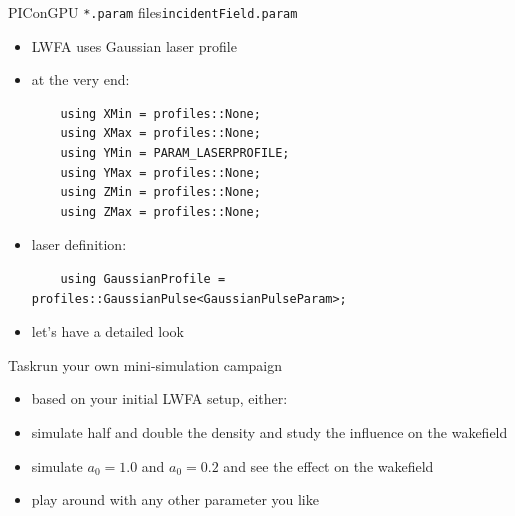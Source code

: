 \documentclass[
  aspectratio=169,
  10pt
]{beamer}
\begin{document}
\begin{frame}[t,fragile]{PIConGPU \texttt{*.param} files}{\texttt{incidentField.param}}

\begin{itemize}
    \item LWFA uses Gaussian laser profile
    \item at the very end:
\begin{verbatim}
    using XMin = profiles::None;
    using XMax = profiles::None;
    using YMin = PARAM_LASERPROFILE;
    using YMax = profiles::None;
    using ZMin = profiles::None;
    using ZMax = profiles::None;    
\end{verbatim}
    \item laser definition:
\begin{verbatim}
    using GaussianProfile = profiles::GaussianPulse<GaussianPulseParam>;
\end{verbatim}    
    \item let's have a detailed look
\end{itemize}

\end{frame}




\begin{frame}[t,fragile]{Task}{run your own mini-simulation campaign}

\begin{itemize}
    \item based on your initial LWFA setup, either:
    \item simulate half and double the density and study the influence on the wakefield
    \item simulate $a_0=1.0$ and $a_0 = 0.2$ and see the effect on the wakefield
    \item play around with any other parameter you like
\end{itemize}

\end{frame}
\end{document}
